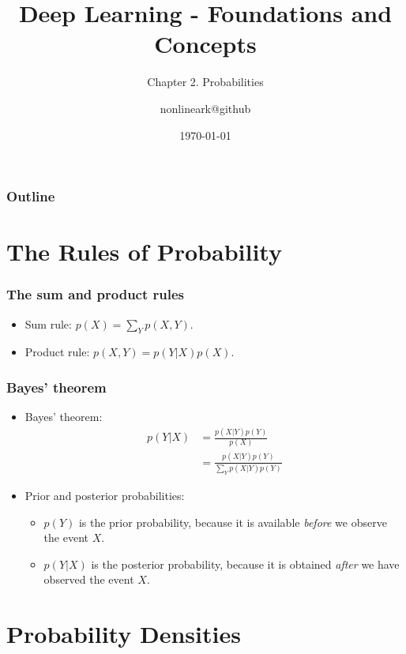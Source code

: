 \documentclass{beamer}
\title{Deep Learning - Foundations and Concepts}
\subtitle{Chapter 2. Probabilities}
\author{nonlineark@github}
\date{\today}
\begin{document}
\begin{frame}
    \titlepage
\end{frame}

\begin{frame}
    \frametitle{Outline}
    \tableofcontents
\end{frame}

\section{The Rules of Probability}

\begin{frame}
    \frametitle{The sum and product rules}
    \begin{itemize}
        \item Sum rule: $p(X)=\sum_{Y}p(X,Y)$.
        \item Product rule: $p(X,Y)=p(Y|X)p(X)$.
    \end{itemize}
\end{frame}

\begin{frame}
    \frametitle{Bayes' theorem}
    \begin{itemize}
        \item Bayes' theorem:
        \begin{align*}
            p(Y|X)&=\frac{p(X|Y)p(Y)}{p(X)} \\
            &=\frac{p(X|Y)p(Y)}{\sum_{Y}p(X|Y)p(Y)}
        \end{align*}
        \item Prior and posterior probabilities:
        \begin{itemize}
            \item $p(Y)$ is the prior probability, because it is available \emph{before} we observe the event $X$.
            \item $p(Y|X)$ is the posterior probability, because it is obtained \emph{after} we have observed the event $X$.
        \end{itemize}
    \end{itemize}
\end{frame}

\section{Probability Densities}
\end{document}
